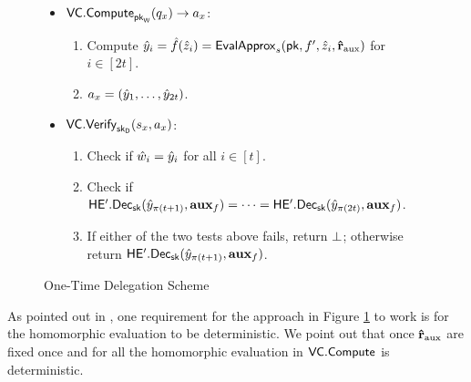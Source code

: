 \begin{figure}
\begin{framed}
\begin{itemize}
\item $\mathsf{VC.Compute}_{\mathsf{pk}_{\mathsf{W}}}(q_x) \rightarrow a_x$:
\begin{enumerate}
\item Compute $\hat{y}_i = \hat{f}(\hat{z}_i) = \mathsf{EvalApprox}_s(\mathsf{pk}, f', \hat{z}_i, \mathbf{\hat{r}}_{\text{aux}})$ for $i \in [2t]$.
\item $a_x = (\hat{y}_1,\dots,\hat{y}_{2t})$.
\end{enumerate}
\item $\mathsf{VC.Verify}_{\mathsf{sk}_{\mathsf{D}}}(s_x, a_x)$:
\begin{enumerate}
\item Check if $\hat{w}_i = \hat{y}_i$ for all $i \in [t]$.
\item Check if $\mathsf{HE'.Dec}_{\mathsf{sk}}(\hat{y}_{\pi(t+1)}, \mathbf{aux}_f) = \dots = \mathsf{HE'.Dec}_{\mathsf{sk}}(\hat{y}_{\pi(2t)}, \mathbf{aux}_f)$.
\item If either of the two tests above fails, return $\bot$; otherwise return $\mathsf{HE'.Dec}_{\mathsf{sk}}(\hat{y}_{\pi(t+1)}, \mathbf{aux}_f)$.
\end{enumerate}
\end{itemize}
\end{framed}
\caption{One-Time Delegation Scheme}
\label{fig:one-time}
\end{figure}

\begin{remark}
As pointed out in \cite{ckv10}, one requirement for the approach in Figure \ref{fig:one-time} to work is for the homomorphic evaluation to be deterministic. We point out that once $\mathbf{\hat{r}}_{\text{aux}}$ are fixed once and for all the homomorphic evaluation in $\mathsf{VC.Compute}$ is deterministic.
\end{remark}



